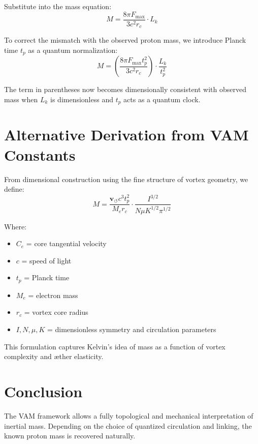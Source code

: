\documentclass[12pt]{article}
\begin{document}
    Substitute into the mass equation:
    \begin{equation}
        M = \frac{8\pi F_{\max}}{3 c^2 r_c} \cdot L_k
    \end{equation}

    To correct the mismatch with the observed proton mass, we introduce Planck time $t_p$ as a quantum normalization:
    \begin{equation}
        M = \left( \frac{8\pi F_{\max} t_p^2}{3 c^2 r_c} \right) \cdot \frac{L_k}{t_p^2}
    \end{equation}

    The term in parentheses now becomes dimensionally consistent with observed mass when $L_k$ is dimensionless and $t_p$ acts as a quantum clock.

    \section{Alternative Derivation from VAM Constants}
    From dimensional construction using the fine structure of vortex geometry, we define:
    \begin{equation}
        \boxed{
            M = \frac{\mathbf{v}_{\scriptscriptstyle\boldsymbol{\circlearrowleft}} c^3 t_p^2}{M_e r_c} \cdot \frac{I^{3/2}}{N \mu K^{1/2} \pi^{1/2}}
        }
    \end{equation}

    Where:
    \begin{itemize}
        \item $C_e$ = core tangential velocity
        \item $c$ = speed of light
        \item $t_p$ = Planck time
        \item $M_e$ = electron mass
        \item $r_c$ = vortex core radius
        \item $I, N, \mu, K$ = dimensionless symmetry and circulation parameters
    \end{itemize}

    This formulation captures Kelvin's idea of mass as a function of vortex complexity and æther elasticity.

    \section*{Conclusion}
    The VAM framework allows a fully topological and mechanical interpretation of inertial mass. Depending on the choice of quantized circulation and linking, the known proton mass is recovered naturally.
\end{document}
